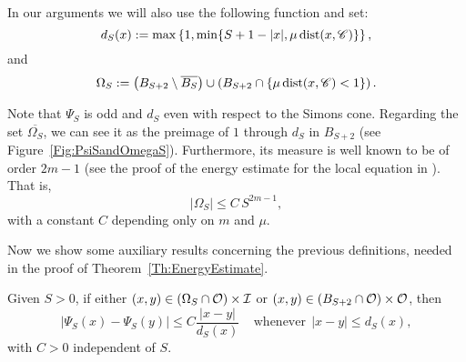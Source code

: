 In our arguments we will also use the following function and set:
$$ 
d_S(x) := \max\left\{1,\min\{S+1-|x|,\mu \operatorname{dist}(x,\mathscr{C})\} \right\},  
$$
and
\begin{equation}
\label{Eq:DefOmegaS}
\Omega_S := \left( B_{S+2}\setminus \overline{B_S} \right) \cup \left( B_{S+2} \cap \{\mu \operatorname{dist}(x,\mathscr{C})< 1\}\right).
\end{equation} 

%		
%		

Note that $\Psi_S$ is odd and $d_S$ even with respect to the Simons cone. Regarding the set $\overline{\Omega_S}$, we can see it as the preimage of $1$ through $d_S$ in $B_{S+2}$ (see Figure~\ref{Fig:PsiSandOmegaS}). Furthermore, its measure is well known to be of order $2m-1$ (see the proof of the energy estimate for the local equation in \cite{CabreTerraI}). That is,
\begin{equation}
\label{Eq:MeasureOmegaS}
|\Omega_S| \leq C\,S^{2m-1},
\end{equation}
with a constant $C$ depending only on $m$ and $\mu$.


Now we show some auxiliary results concerning the previous definitions, needed in the proof of Theorem~\ref{Th:EnergyEstimate}.

\begin{lemma}
\label{Lemma:AdaptedLipschitzConditionWith_dFunction}
Given $S>0$, if either $(x,y) \in \left(\Omega_S\cap \mathcal{O}\right) \times \mathcal{I}$ or $(x,y)\in \left(B_{S+2}\cap \mathcal{O}\right) \times \mathcal{O}$, then
$$ |\Psi_S(x) - \Psi_S(y)| \leq C \frac{|x-y|}{d_S(x)} \ \ \ \ \ \textrm{whenever} \ \ |x-y|\leq d_S(x), $$
with $C>0$ independent of $S$.
\end{lemma}

